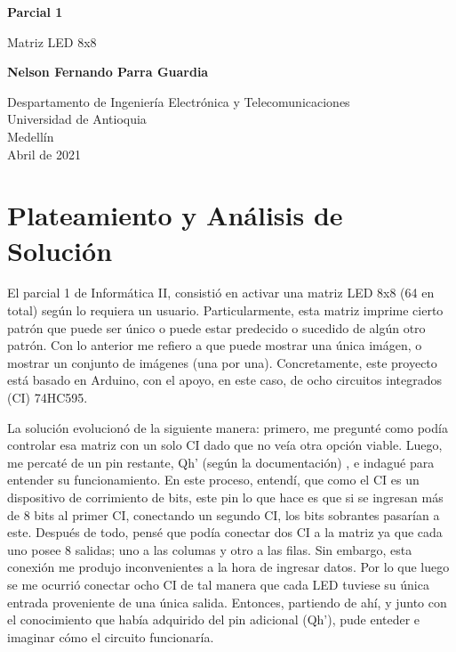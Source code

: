 \documentclass{article}
\begin{document}
\begin{titlepage}
    \begin{center}
        \vspace*{1cm}
            
        \Huge
        \textbf{Parcial 1}
            
        \vspace{0.5cm}
        \LARGE
        Matriz LED 8x8
            
        \vspace{1.5cm}
            
        \textbf{Nelson Fernando Parra Guardia}
            
        \vfill
            
        \vspace{0.8cm}
            
        \Large
        Despartamento de Ingeniería Electrónica y Telecomunicaciones\\
        Universidad de Antioquia\\
        Medellín\\
        Abril de 2021
            
    \end{center}
\end{titlepage}

\tableofcontents
\newpage

\section{Plateamiento y Análisis de Solución}\label{first}
\par El parcial 1 de Informática II, consistió en activar una matriz LED 8x8 (64 en total) según lo requiera un usuario. Particularmente, esta matriz imprime cierto patrón que puede ser único o puede estar predecido o sucedido de algún otro patrón. Con lo anterior me refiero a que puede mostrar una única imágen, o mostrar un conjunto de imágenes (una por una).  Concretamente, este proyecto está basado en Arduino, con el apoyo, en este caso, de ocho circuitos integrados (CI) 74HC595. \par La solución evolucionó de la siguiente manera: primero, me pregunté como podía controlar esa matriz con un solo CI dado que no veía otra opción viable. Luego, me percaté de un pin restante, Qh' (según la documentación) \cite{ci}, e indagué para entender su funcionamiento. En este proceso, entendí, que como el CI es un dispositivo de corrimiento de bits, este pin lo que hace es que si se ingresan más de 8 bits al primer CI, conectando un segundo CI, los bits sobrantes pasarían a este. Después de todo, pensé que podía conectar dos CI a la matriz ya que cada uno posee 8 salidas; uno a las columas y otro a las filas. Sin embargo, esta conexión me produjo inconvenientes a la hora de ingresar datos. Por lo que luego se me ocurrió conectar ocho CI de tal manera que cada LED tuviese su única entrada proveniente de una única salida. Entonces, partiendo de ahí, y junto con el conocimiento que había adquirido del pin adicional (Qh'), pude enteder e imaginar cómo el circuito funcionaría.
\end{document}
